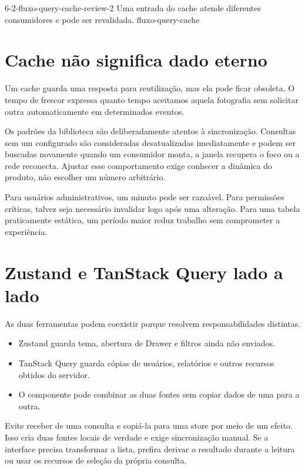 \imagemcapitulo
  {6-2-fluxo-query-cache-review-2}
  {Uma entrada do cache atende diferentes consumidores e pode ser revalidada.}
  {fluxo-query-cache}

\section{Cache não significa dado eterno}

Um cache guarda uma resposta para reutilização, mas ela pode ficar obsoleta. O
tempo de frescor expressa quanto tempo aceitamos aquela fotografia sem solicitar
outra automaticamente em determinados eventos.

Os padrões da biblioteca são deliberadamente atentos à sincronização. Consultas
sem um  configurado são consideradas desatualizadas
imediatamente e podem ser buscadas novamente quando um consumidor monta, a janela
recupera o foco ou a rede reconecta. Ajustar esse comportamento exige conhecer a
dinâmica do produto, não escolher um número arbitrário.

Para usuários administrativos, um minuto pode ser razoável. Para permissões
críticas, talvez seja necessário invalidar logo após uma alteração. Para uma
tabela praticamente estática, um período maior reduz trabalho sem comprometer a
experiência.

\section{Zustand e TanStack Query lado a lado}

As duas ferramentas podem coexistir porque resolvem responsabilidades distintas.

\begin{itemize}
  \item Zustand guarda tema, abertura de Drawer e filtros ainda não enviados.
  \item TanStack Query guarda cópias de usuários, relatórios e outros recursos
    obtidos do servidor.
  \item O componente pode combinar as duas fontes sem copiar dados de uma para a
    outra.
\end{itemize}

Evite receber  de uma consulta e copiá-la para uma store por meio de
um efeito. Isso cria duas fontes locais de verdade e exige sincronização manual.
Se a interface precisa transformar a lista, prefira derivar o resultado durante
a leitura ou usar os recursos de seleção da própria consulta.

